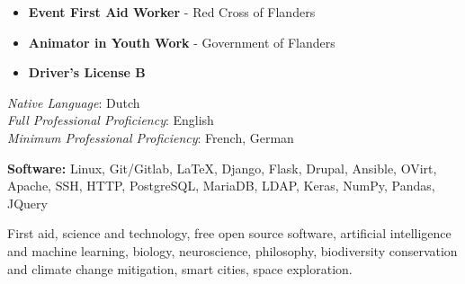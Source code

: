 
\begin{itemize}
    \item \textbf{Event First Aid Worker} - Red Cross of Flanders
    \item \textbf{Animator in Youth Work} - Government of Flanders
    \item \textbf{Driver's License B}
\end{itemize}








\textit{Native Language}: Dutch \\
\textit{Full Professional Proficiency}: English \\
\textit{Minimum Professional Proficiency}: French, German \\





\smallskip

\textbf{Software:} Linux, Git/Gitlab, \LaTeX, Django, Flask, Drupal, Ansible, OVirt, Apache, SSH, HTTP, PostgreSQL, MariaDB, LDAP, Keras, NumPy, Pandas, JQuery

First aid, science and technology, free open source software, artificial intelligence and machine learning, biology, neuroscience, philosophy, biodiversity conservation and climate change mitigation, smart cities, space exploration.

